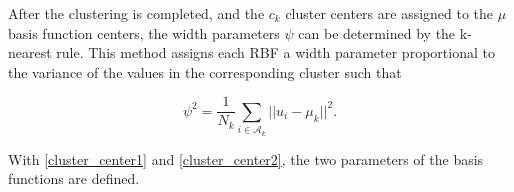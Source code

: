 After the clustering is completed, and the $c_k$ cluster centers are assigned to the $\mu$ basis function centers, the width parameters $\psi$ can be determined by the k-nearest rule. This method assigns each RBF a width parameter proportional to the variance of the values in the corresponding cluster such that 

 \begin{equation}
\label{cluster_center2}
\psi^2 = \frac{1}{N_k} \sum_{i \in \mathcal{A}_k}  ||u_i - \mu_k||^2.
\end{equation}

With \eqref{cluster_center1} and \eqref{cluster_center2}, the two parameters of the basis functions are defined. 
